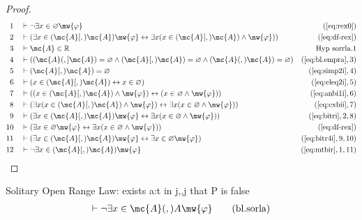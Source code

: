 \begin{proof}
\begin{align}
  1 &&  & \vdash \lnot \exists x \in \varnothing
     \mw{\varphi}&(\mbox{\ref{eq:rex0}})\notag
  \\ 2 &&  & \vdash ( \exists x \in ( \mc{A} [,) \mc{A} ) \mw{\varphi} \leftrightarrow
     \exists x ( x \in ( \mc{A} [,) \mc{A} ) \wedge \mw{\varphi} )
     )&(\mbox{\ref{eq:df-rex}})\notag
  \\ 3 &&  & \vdash \mc{A} \in \mathbb{R}&\text{Hyp~sorrla.1}\notag%
  \\ 4 &&  & \vdash ( ( \mc{A} (,] \mc{A} ) = \varnothing \wedge ( \mc{A} [,) \mc{A} ) =
     \varnothing \wedge ( \mc{A} (,) \mc{A} ) = \varnothing
     )&(\mbox{\ref{eq:bl.empra}},3)\notag
  \\ 5 &&  & \vdash ( \mc{A} [,) \mc{A} ) = \varnothing&(\mbox{\ref{eq:simp2i}},4)\notag
  \\ 6 &&  & \vdash ( x \in ( \mc{A} [,) \mc{A} ) \leftrightarrow x \in \varnothing
     )&(\mbox{\ref{eq:eleq2i}},5)\notag
  \\ 7 &&  & \vdash ( ( x \in ( \mc{A} [,) \mc{A} ) \wedge \mw{\varphi} ) \leftrightarrow
     ( x \in \varnothing \wedge \mw{\varphi} )
     )&(\mbox{\ref{eq:anbi1i}},6)\notag
  \\ 8 &&  & \vdash ( \exists x ( x \in ( \mc{A} [,) \mc{A} ) \wedge \mw{\varphi} )
     \leftrightarrow \exists x ( x \in \varnothing \wedge
     \mw{\varphi} ) )&(\mbox{\ref{eq:exbii}},7)\notag
  \\ 9 &&  & \vdash ( \exists x \in ( \mc{A} [,) \mc{A} ) \mw{\varphi} \leftrightarrow
     \exists x ( x \in \varnothing \wedge \mw{\varphi} )
     )&(\mbox{\ref{eq:bitri}},2,8)\notag
  \\ 10 &&  & \vdash ( \exists x \in \varnothing \mw{\varphi} \leftrightarrow
     \exists x ( x \in \varnothing \wedge \mw{\varphi} )
     )&(\mbox{\ref{eq:df-rex}})\notag
  \\ 11 &&  & \vdash ( \exists x \in ( \mc{A} [,) \mc{A} ) \mw{\varphi} \leftrightarrow
     \exists x \in \varnothing \mw{\varphi}
     )&(\mbox{\ref{eq:bitr4i}},9,10)\notag
  \\ 12 &&  & \vdash \lnot \exists x \in ( \mc{A} [,) \mc{A} )
     \mw{\varphi}&(\mbox{\ref{eq:mtbir}},1,11)\notag
\end{align}
\end{proof}

\begin{lemma} {Solitary Open Range Law: exists a:t in
j,,j that P is false}
\begin{align}
\vdash \lnot \exists x \in \mc{A} (,) A
    \mw{\varphi}\label{eq:bl.sorla}\tag{bl.sorla}
\end{align}
\end{lemma}

